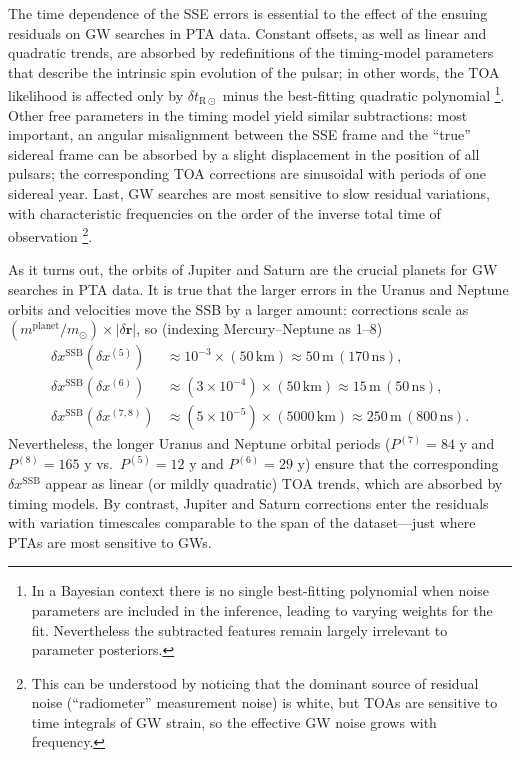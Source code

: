 \documentclass[reprint,
 amsmath,amssymb,
 aps,prd,floatfix,
]{revtex4-1}
\begin{document}
The time dependence of the SSE errors is essential to the effect of the ensuing residuals on GW searches in PTA data. Constant offsets, as well as linear and quadratic trends, are absorbed by redefinitions of the timing-model parameters that describe the intrinsic spin evolution of the pulsar; in other words, the TOA likelihood is affected only by $\delta t_{\mathrm{R}\odot}$ minus the best-fitting quadratic polynomial \footnote{In a Bayesian context there is no single best-fitting polynomial when noise parameters are included in the inference, leading to varying weights for the fit. Nevertheless the subtracted features remain largely irrelevant to parameter posteriors.}. Other free parameters in the timing model yield similar subtractions: most important, an angular misalignment between the SSE frame and the ``true'' sidereal frame can be absorbed by a slight displacement in the position of all pulsars; the corresponding TOA corrections are sinusoidal with periods of one sidereal year.
Last, GW searches are most sensitive to slow residual variations, with characteristic frequencies on the order of the inverse total time of observation \footnote{This can be understood by noticing that the dominant source of residual noise (``radiometer'' measurement noise) is white, but TOAs are sensitive to time integrals of GW strain, so the effective GW noise grows with frequency.}.

As it turns out, the orbits of Jupiter and Saturn are the crucial planets for GW searches in PTA data.  It is true that the larger errors in the Uranus and Neptune orbits and velocities move the SSB by a larger amount: corrections scale as $(m^\mathrm{planet}/m_\mathrm{\odot}) \times |\delta \mathbf{r}|$, so (indexing Mercury--Neptune as 1--8)
%
\begin{equation}
    \begin{aligned}
    \delta x^\mathrm{SSB}(\delta x^{(5)}) & \approx 10^{-3} \!\times\! (50 \, \mathrm{km}) \approx 50 \, \mathrm{m} \, (170 \, \mathrm{ns}), \\
    \delta x^\mathrm{SSB}(\delta x^{(6)}) & \approx (3 \!\times\! 10^{-4}) \!\times\! (50 \, \mathrm{km}) \approx 15 \, \mathrm{m} \, (50 \, \mathrm{ns}), \\
    \delta x^\mathrm{SSB}(\delta x^{(7,8)}) & \approx (5 \!\times\! 10^{-5}) \!\times\! (5000 \, \mathrm{km}) \approx 250 \, \mathrm{m} \, (800 \, \mathrm{ns}).
    \end{aligned}
\end{equation}
%
Nevertheless, the longer Uranus and Neptune orbital periods ($P^{(7)} = 84$ y and $P^{(8)} = 165$ y vs.\ $P^{(5)} = 12$ y and $P^{(6)} = 29$ y) ensure that the corresponding $\delta x^\mathrm{SSB}$ appear as linear (or mildly quadratic) TOA trends, which are absorbed by timing models. By contrast, Jupiter and Saturn corrections enter the residuals with variation timescales comparable to the span of the dataset---just where PTAs are most sensitive to GWs.
\end{document}

